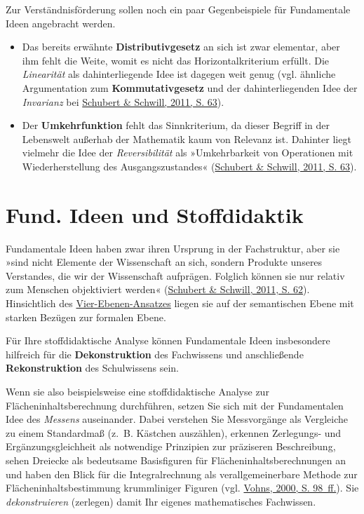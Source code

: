 \documentclass[
]{scrbook}
\providecommand{\tightlist}{%
  \setlength{\itemsep}{0pt}\setlength{\parskip}{0pt}}
\theoremstyle{definition}
\theoremstyle{definition}
\theoremstyle{definition}
\theoremstyle{definition}
\theoremstyle{remark}
\begin{document}
Zur Verständnisförderung sollen noch ein paar Gegenbeispiele für Fundamentale Ideen angebracht werden.

\begin{itemize}
\tightlist
\item
  Das bereits erwähnte \textbf{Distributivgesetz} an sich ist zwar elementar, aber ihm fehlt die Weite, womit es nicht das Horizontalkriterium erfüllt. Die \emph{Linearität} als dahinterliegende Idee ist dagegen weit genug (vgl. ähnliche Argumentation zum \textbf{Kommutativgesetz} und der dahinterliegenden Idee der \emph{Invarianz} bei \protect\hyperlink{ref-Schubert:2011}{Schubert \& Schwill, 2011, S. 63}).
\item
  Der \textbf{Umkehrfunktion} fehlt das Sinnkriterium, da dieser Begriff in der Lebenswelt außerhab der Mathematik kaum von Relevanz ist. Dahinter liegt vielmehr die Idee der \emph{Reversibilität} als »Umkehrbarkeit von Operationen mit Wiederherstellung des Ausgangszustandes« (\protect\hyperlink{ref-Schubert:2011}{Schubert \& Schwill, 2011, S. 63}).
\end{itemize}

\hypertarget{fund.-ideen-und-stoffdidaktik}{%
\section{Fund. Ideen und Stoffdidaktik}\label{fund.-ideen-und-stoffdidaktik}}

Fundamentale Ideen haben zwar ihren Ursprung in der Fachstruktur, aber sie »sind nicht Elemente der Wissenschaft an sich, sondern Produkte unseres Verstandes, die wir der Wissenschaft aufprägen. Folglich können sie nur relativ zum Menschen objektiviert werden« (\protect\hyperlink{ref-Schubert:2011}{Schubert \& Schwill, 2011, S. 62}). Hinsichtlich des \protect\hyperlink{tab:fragen-ebenen}{Vier-Ebenen-Ansatzes} liegen sie auf der \textcolor{semanticColor}{semantischen Ebene} mit starken Bezügen zur \textcolor{formalColor}{formalen Ebene}.

Für Ihre stoffdidaktische Analyse können Fundamentale Ideen insbesondere hilfreich für die \textbf{Dekonstruktion} des Fachwissens und anschließende \textbf{Rekonstruktion} des Schulwissens sein.

Wenn sie also beispielsweise eine stoffdidaktische Analyse zur Flächeninhaltsberechnung durchführen, setzen Sie sich mit der Fundamentalen Idee des \emph{Messens} auseinander. Dabei verstehen Sie Messvorgänge als Vergleiche zu einem Standardmaß (z.~B. Kästchen auszählen), erkennen Zerlegungs- und Ergänzungsgleichheit als notwendige Prinzipien zur präziseren Beschreibung, sehen Dreiecke als bedeutsame Basisfiguren für Flächeninhaltsberechnungen an und haben den Blick für die Integralrechnung als verallgemeinerbare Methode zur Flächeninhaltsbestimmung krummliniger Figuren (vgl. \protect\hyperlink{ref-Vohns:2000}{Vohns, 2000, S. 98~ff.}). Sie \emph{dekonstruieren} (zerlegen) damit Ihr eigenes mathematisches Fachwissen.
\end{document}
